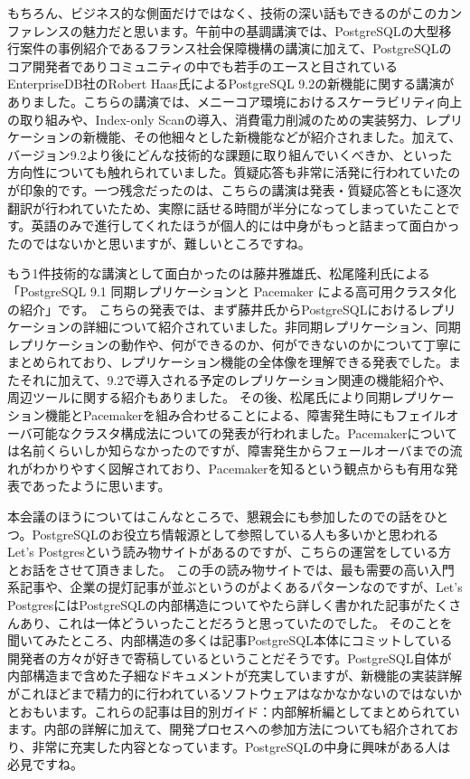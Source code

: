 \documentclass[b5paper]{jsbook}
\begin{document}
もちろん、ビジネス的な側面だけではなく、技術の深い話もできるのがこのカンファレンスの魅力だと思います。午前中の基調講演では、PostgreSQLの大型移行案件の事例紹介であるフランス社会保障機構の講演に加えて、PostgreSQLのコア開発者でありコミュニティの中でも若手のエースと目されているEnterpriseDB社のRobert Haas氏によるPostgreSQL 9.2の新機能に関する講演がありました。こちらの講演では、メニーコア環境におけるスケーラビリティ向上の取り組みや、Index-only Scanの導入、消費電力削減のための実装努力、レプリケーションの新機能、その他細々とした新機能などが紹介されました。加えて、バージョン9.2より後にどんな技術的な課題に取り組んでいくべきか、といった方向性についても触れられていました。質疑応答も非常に活発に行われていたのが印象的です。一つ残念だったのは、こちらの講演は発表・質疑応答ともに逐次翻訳が行われていたため、実際に話せる時間が半分になってしまっていたことです。英語のみで進行してくれたほうが個人的には中身がもっと詰まって面白かったのではないかと思いますが、難しいところですね。

もう1件技術的な講演として面白かったのは藤井雅雄氏、松尾隆利氏による「PostgreSQL 9.1 同期レプリケーションと Pacemaker による高可用クラスタ化の紹介」です。 こちらの発表では、まず藤井氏からPostgreSQLにおけるレプリケーションの詳細について紹介されていました。非同期レプリケーション、同期レプリケーションの動作や、何ができるのか、何ができないのかについて丁寧にまとめられており、レプリケーション機能の全体像を理解できる発表でした。またそれに加えて、9.2で導入される予定のレプリケーション関連の機能紹介や、周辺ツールに関する紹介もありました。 その後、松尾氏により同期レプリケーション機能とPacemakerを組み合わせることによる、障害発生時にもフェイルオーバ可能なクラスタ構成法についての発表が行われました。Pacemakerについては名前くらいしか知らなかったのですが、障害発生からフェールオーバまでの流れがわかりやすく図解されており、Pacemakerを知るという観点からも有用な発表であったように思います。

本会議のほうについてはこんなところで、懇親会にも参加したのでの話をひとつ。PostgreSQLのお役立ち情報源として参照している人も多いかと思われるLet’s Postgresという読み物サイトがあるのですが、こちらの運営をしている方とお話をさせて頂きました。 この手の読み物サイトでは、最も需要の高い入門系記事や、企業の提灯記事が並ぶというのがよくあるパターンなのですが、Let’s PostgresにはPostgreSQLの内部構造についてやたら詳しく書かれた記事がたくさんあり、これは一体どういったことだろうと思っていたのでした。 そのことを聞いてみたところ、内部構造の多くは記事PostgreSQL本体にコミットしている開発者の方々が好きで寄稿しているということだそうです。PostgreSQL自体が内部構造まで含めた子細なドキュメントが充実していますが、新機能の実装詳解がこれほどまで精力的に行われているソフトウェアはなかなかないのではないかとおもいます。これらの記事は目的別ガイド：内部解析編としてまとめられています。内部の詳解に加えて、開発プロセスへの参加方法についても紹介されており、非常に充実した内容となっています。PostgreSQLの中身に興味がある人は必見ですね。
\end{document}
